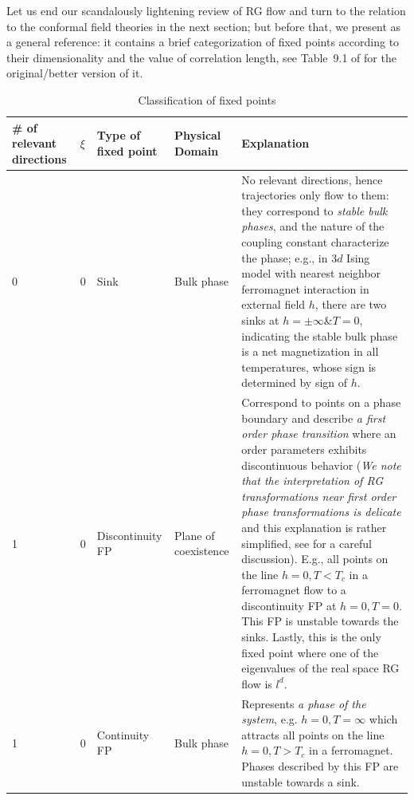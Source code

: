 \documentclass[12pt]{article}
\numberwithin{equation}{section}
\begin{document}
Let us end our scandalously lightening review of  RG flow and turn to the relation to the conformal field theories in the next section; but before that, we present \tabref{\ref{table:classification of fixed points}} as a general reference: it contains a brief categorization of fixed points according to their dimensionality and the value of correlation length, see Table~9.1 of \cite{Goldenfeld:1992qy} for the original/better version of it.

\begin{table}
	\scriptsize
	\caption{\label{table:classification of fixed points}Classification of fixed points}
	\centering
	\begin{tabular}{lllll}
		\hline\hline
		\textbf{\# of relevant directions} & \textbf{$\xi$}&\textbf{Type of fixed point}&\textbf{Physical Domain}&\textbf{Explanation}\\\hline
		0&0&Sink&Bulk phase&\begin{minipage}{.4\textwidth}
			No relevant directions, hence trajectories only flow to them: they correspond to \emph{stable bulk phases}, and the nature of the coupling constant characterize the phase; e.g., in $3d$ Ising model with nearest neighbor ferromagnet interaction in external field $h$, there are two sinks at \mbox{$h=\pm\infty$\&$T=0$}, indicating the stable bulk phase is a net magnetization in all temperatures, whose sign is determined by sign of $h$.
		\end{minipage}
		\\\hline
		1&0&Discontinuity FP&Plane of coexistence&
		\begin{minipage}{.4\textwidth}
			Correspond to points on a phase boundary and describe \emph{a first order phase transition} where an order parameters exhibits discontinuous behavior (\emph{We note that the interpretation of RG transformations near first order phase transformations is delicate }and this explanation is rather simplified, see \cite{Sokal:1991ui} for a careful discussion). E.g., all points on the line \mbox{$h=0, T<T_c$} in a ferromagnet flow to a discontinuity FP at \mbox{$h=0,T=0$}. This FP is unstable towards the sinks. Lastly, this is the only fixed point where one of the eigenvalues of the real space RG flow is $l^d$.\footnotemark
		\end{minipage}
		\\\hline 
		1&0&Continuity FP&Bulk phase&
		\begin{minipage}{.4\textwidth}
			Represents \emph{a phase of the system}, e.g. \mbox{$h=0, T=\infty$} which attracts all points on the line \mbox{$h=0,T>T_c$} in a ferromagnet. Phases described by this FP are unstable towards a sink.

\end{minipage}
\end{tabular}
\end{table}
\end{document}
